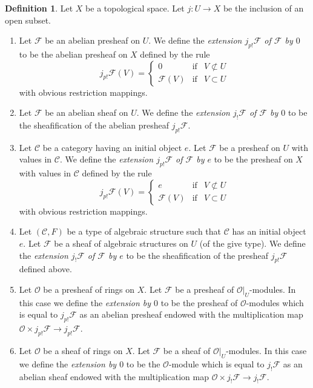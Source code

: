 \documentclass{stacks-project}
\theoremstyle{plain}
\theoremstyle{definition}
\newtheorem{definition}[subsection]{Definition}
\theoremstyle{remark}
\numberwithin{equation}{subsection}
\begin{document}
\begin{definition}
\label{definition-j-shriek-structures}
Let $X$ be a topological space.
Let $j : U \to X$ be the inclusion of an open subset.
\begin{enumerate}
\item Let $\mathcal{F}$ be an abelian presheaf on $U$.
We define the {\it extension $j_{p!}\mathcal{F}$ of $\mathcal{F}$ by $0$}
to be the abelian presheaf on $X$ defined by the rule
$$
j_{p!}\mathcal{F}(V) =
\left\{
\begin{matrix}
0 & \text{if} & V \not \subset U \\
\mathcal{F}(V) & \text{if} & V \subset U
\end{matrix}
\right.
$$
with obvious restriction mappings.
\item Let $\mathcal{F}$ be an abelian sheaf on $U$. We define
the {\it extension $j_!\mathcal{F}$ of $\mathcal{F}$ by $0$}
to be the sheafification of the abelian presheaf $j_{p!}\mathcal{F}$.
\item Let $\mathcal{C}$ be a category having an initial object $e$.
Let $\mathcal{F}$ be a presheaf on $U$ with values in $\mathcal{C}$.
We define the {\it extension $j_{p!}\mathcal{F}$ of $\mathcal{F}$ by $e$}
to be the presheaf on $X$ with values in $\mathcal{C}$ defined by the
rule
$$
j_{p!}\mathcal{F}(V) =
\left\{
\begin{matrix}
e & \text{if} & V \not \subset U \\
\mathcal{F}(V) & \text{if} & V \subset U
\end{matrix}
\right.
$$
with obvious restriction mappings.
\item Let $(\mathcal{C}, F)$ be a type of algebraic structure
such that $\mathcal{C}$ has an initial object $e$.
Let $\mathcal{F}$ be a sheaf of algebraic structures on $U$
(of the give type). We define the
{\it extension $j_!\mathcal{F}$ of $\mathcal{F}$ by $e$}
to be the sheafification of the presheaf $j_{p!}\mathcal{F}$
defined above.
\item Let $\mathcal{O}$ be a presheaf of rings on $X$.
Let $\mathcal{F}$ be a presheaf of $\mathcal{O}|_U$-modules.
In this case we define the {\it extension by $0$}
to be the presheaf of $\mathcal{O}$-modules which is equal to
$j_{p!}\mathcal{F}$ as an abelian presheaf endowed with
the multiplication map
$\mathcal{O} \times j_{p!}\mathcal{F} \to j_{p!}\mathcal{F}$.
\item Let $\mathcal{O}$ be a sheaf of rings on $X$.
Let $\mathcal{F}$ be a sheaf of $\mathcal{O}|_U$-modules.
In this case we define the {\it extension by $0$}
to be the $\mathcal{O}$-module which is equal to
$j_!\mathcal{F}$ as an abelian sheaf endowed with
the multiplication map $\mathcal{O} \times j_!\mathcal{F} \to j_!\mathcal{F}$.
\end{enumerate}
\end{definition}
\end{document}
